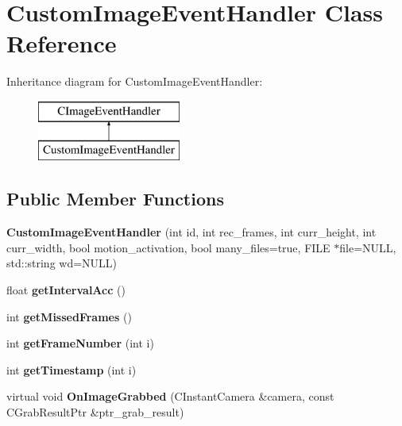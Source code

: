 \hypertarget{class_custom_image_event_handler}{}\section{Custom\+Image\+Event\+Handler Class Reference}
\label{class_custom_image_event_handler}
Inheritance diagram for Custom\+Image\+Event\+Handler\+:\begin{figure}[H]
\begin{center}
\leavevmode
\includegraphics[height=2.000000cm]{class_custom_image_event_handler}
\end{center}
\end{figure}
\subsection*{Public Member Functions}
\begin{DoxyCompactItemize}
\item 
\mbox{\label{class_custom_image_event_handler_aa316ec6c7965e60e0961d47c0c840b71}} 
{\bfseries Custom\+Image\+Event\+Handler} (int id, int rec\+\_\+frames, int curr\+\_\+height, int curr\+\_\+width, bool motion\+\_\+activation, bool many\+\_\+files=true, F\+I\+LE $\ast$file=N\+U\+LL, std\+::string wd=N\+U\+LL)
\item 
\mbox{\label{class_custom_image_event_handler_af475f5434b7c23b2a38f55faa1c7ae6d}} 
float {\bfseries get\+Interval\+Acc} ()
\item 
\mbox{\label{class_custom_image_event_handler_a1a0befdf9df3e4d6adcdb0db1e94341f}} 
int {\bfseries get\+Missed\+Frames} ()
\item 
\mbox{\label{class_custom_image_event_handler_ad6b912e16585b108301f8fed281b9ef0}} 
int {\bfseries get\+Frame\+Number} (int i)
\item 
\mbox{\label{class_custom_image_event_handler_a7f0ef648d61b5f108ba1181471782ffc}} 
int {\bfseries get\+Timestamp} (int i)
\item 
\mbox{\label{class_custom_image_event_handler_a27ba6a6e5b1823acbc12c279eede0cce}} 
virtual void {\bfseries On\+Image\+Grabbed} (C\+Instant\+Camera \&camera, const C\+Grab\+Result\+Ptr \&ptr\+\_\+grab\+\_\+result)
\end{DoxyCompactItemize}
